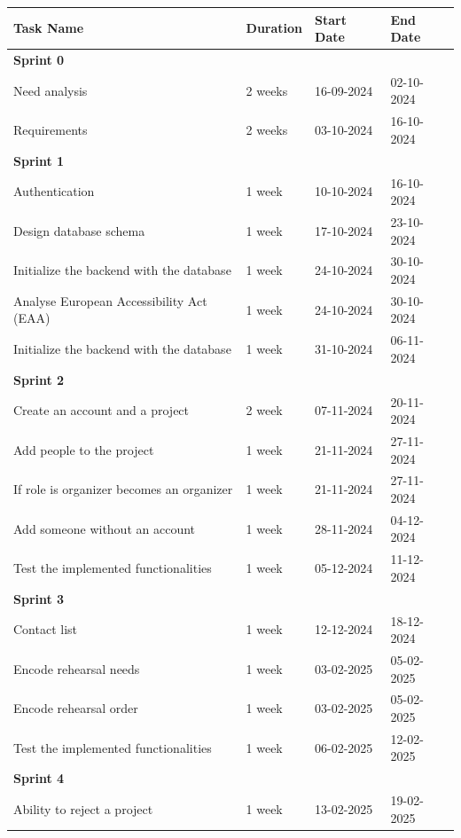 \documentclass[11pt]{article}
\begin{document}
\begin{table}[htbp]
    \centering
    \begin{tabular}{| p{9cm} | p{2cm} | p{2.1cm} | p{2cm} |}
    \hline
    \textbf{Task Name} & \textbf{Duration} & \textbf{Start Date} & \textbf{End Date} \\
    \hline
    \textbf{Sprint 0} &&&\\
    \quad Need analysis & 2 weeks & 16-09-2024 & 02-10-2024 \\
    \quad Requirements & 2 weeks & 03-10-2024 & 16-10-2024 \\
    \textbf{Sprint 1} &&&\\
    \quad Authentication & 1 week & 10-10-2024 & 16-10-2024 \\
    \quad Design database schema & 1 week & 17-10-2024 & 23-10-2024 \\
    \quad Initialize the backend with the database & 1 week & 24-10-2024 & 30-10-2024 \\
    \quad Analyse European Accessibility Act (EAA) & 1 week & 24-10-2024 & 30-10-2024 \\
    \quad Initialize the backend with the database & 1 week & 31-10-2024 & 06-11-2024\\
    \textbf{Sprint 2} &&&\\
    \quad Create an account and a project & 2 week & 07-11-2024 & 20-11-2024 \\
    \quad Add people to the project & 1 week & 21-11-2024 & 27-11-2024 \\
    \quad If role is organizer becomes an organizer & 1 week & 21-11-2024 & 27-11-2024 \\
    \quad Add someone without an account & 1 week & 28-11-2024 & 04-12-2024 \\
    \quad Test the implemented functionalities & 1 week & 05-12-2024 & 11-12-2024\\
    \textbf{Sprint 3} &&&\\
    \quad Contact list & 1 week & 12-12-2024 & 18-12-2024 \\
    \quad Encode rehearsal needs & 1 week & 03-02-2025 & 05-02-2025 \\
    \quad Encode rehearsal order & 1 week & 03-02-2025 & 05-02-2025 \\
    \quad Test the implemented functionalities & 1 week & 06-02-2025 & 12-02-2025\\
    \textbf{Sprint 4} &&&\\
    \quad Ability to reject a project & 1 week & 13-02-2025 & 19-02-2025 \\

\end{tabular}
\end{table}
\end{document}
